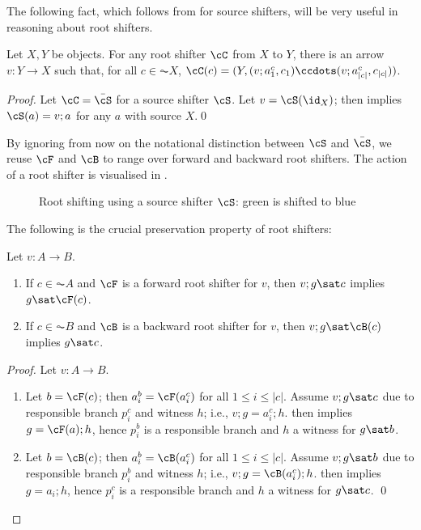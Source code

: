 \begin{fullorname}
The following fact, which follows from  for source shifters, will be very useful in reasoning about root shifters.
%
\begin{lemma}
Let $X,Y$ be objects. For any root shifter $\cC$ from $X$ to $Y$, there is an arrow $v:Y\to X$ such that, for all $c\in \AC X$, $\cC(c)= (Y,(v;a^c_1,c_1)\ccdots (v;a^c_{|c|},c_{|c|}))$.
\end{lemma}
%
\begin{proof}
Let $\cC=\bar\cS$ for a source shifter $\cS$. Let $v=\cS(\id_X)$; then  implies $\cS(a)=v;a$ for any $a$ with source $X$.\qed
\end{proof}
\end{fullorname}
%
By ignoring from now on the notational distinction between $\cS$ and $\bar\cS$, we reuse $\cF$ and $\cB$ to range over forward and backward root shifters. The action of a root shifter is visualised in .
%
\begin{figure}[t]
\centering

\caption{Root shifting using a source shifter $\cS$: green is shifted to blue}
\end{figure}
%
The following is the crucial preservation property of root shifters:
%
\begin{proposition}
Let $v:A\to B$.
\begin{enumerate}[topsep=\smallskipamount]
\item If $c\in \AC A$ and $\cF$ is a forward root shifter for $v$, then $v;g\sat c$ implies $g\sat \cF(c)$.
\item If $c\in \AC B$ and $\cB$ is a backward root shifter for $v$, then $v;g\sat \cB(c)$ implies $g\sat c$.
\end{enumerate}
\end{proposition}
%
\begin{fullorname}
\begin{proof}
Let $v:A\to B$.
\begin{enumerate}
\item Let $b=\cF(c)$; then $a^b_i=\cF(a^c_i)$ for all $1\leq i\leq |c|$. Assume $v;g\sat c$ due to responsible branch $p^c_i$ and witness $h$; i.e., $v;g=a^c_i;h$.  then implies $g=\cF(a);h$, hence $p^b_i$ is a responsible branch and $h$ a witness for $g\sat b$.
\item Let $b=\cB(c)$; then $a^b_i=\cB(a^c_i)$ for all $1\leq i\leq |c|$. Assume $v;g\sat b$ due to responsible branch $p^b_i$ and witness $h$; i.e., $v;g=\cB(a^c_i);h$.  then implies $g=a_i;h$, hence $p^c_i$ is a responsible branch and $h$ a witness for $g\sat c$.
\qed
\end{enumerate}
\end{proof}
\end{fullorname}
